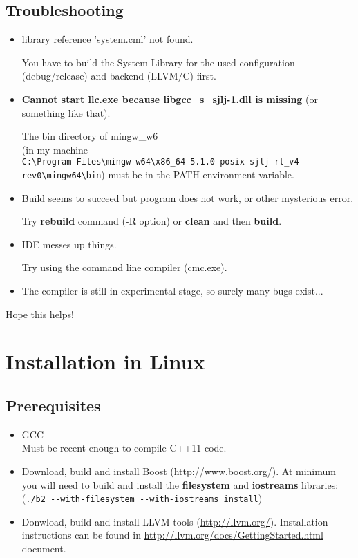 \documentclass[oneside, a4paper, 11pt]{article}
\begin{document}
\subsection{Troubleshooting}

\begin{itemize}

\item
library reference 'system.cml' not found.

You have to build the System Library for the used configuration (debug/release) and backend (LLVM/C) first.

\item
\textbf{Cannot start llc.exe because libgcc\_s\_sjlj-1.dll is missing} (or something like that).

The bin directory of mingw\_w6\\
(in my machine\\
\verb|C:\Program Files\mingw-w64\x86_64-5.1.0-posix-sjlj-rt_v4-rev0\mingw64\bin|)
must be in the PATH environment variable.

\item
Build seems to succeed but program does not work, or other mysterious error.

Try \textbf{rebuild} command (-R option) or \textbf{clean} and then \textbf{build}.

\item
IDE messes up things.

Try using the command line compiler (cmc.exe).

\item
The compiler is still in experimental stage, so surely many bugs exist...

\end{itemize}

Hope this helps!

\section{Installation in Linux}

\subsection{Prerequisites}

\begin{itemize}

\item
GCC\\
Must be recent enough to compile C++11 code.

\item
Download, build and install Boost (\url{http://www.boost.org/}).
At minimum you will need to build and install the
\textbf{filesystem} and \textbf{iostreams} libraries:\\
(\verb|./b2 --with-filesystem --with-iostreams install|)

\item
Donwload, build and install LLVM tools (\url{http://llvm.org/}).
Installation instructions can be found in \url{http://llvm.org/docs/GettingStarted.html} document.

\end{itemize}
\end{document}
